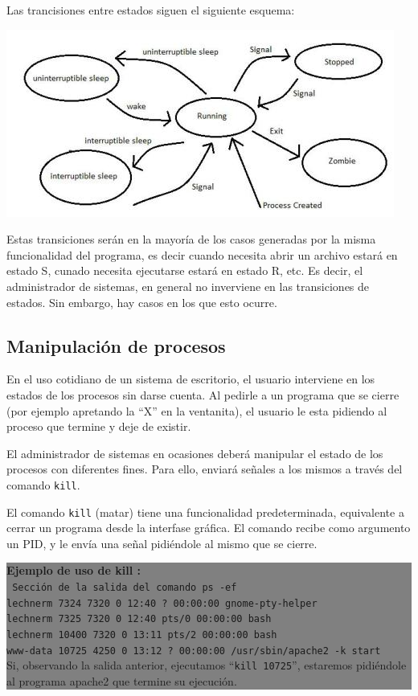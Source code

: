 \documentclass[12pt]{article}
\begin{document}
Las trancisiones entre estados siguen el siguiente esquema: 
\begin{center}
 \includegraphics{process-states-s.jpg}
\end{center}
 
Estas transiciones serán en la mayoría de los casos generadas por la misma
funcionalidad del programa, es decir cuando necesita abrir un archivo
estará en estado S, cunado necesita ejecutarse estará en estado R, etc. 
Es decir, el administrador de sistemas, en general no inverviene en las
transiciones de estados. Sin embargo, hay casos en los que esto ocurre. 

\subsection{Manipulación de procesos}

En el uso cotidiano de un sistema de escritorio, el usuario interviene 
en los estados de los procesos sin darse cuenta. Al pedirle a un programa
que se cierre (por ejemplo apretando la ``X'' en la ventanita), el usuario
le esta pidiendo al proceso que termine y deje de existir. 

El administrador de sistemas en ocasiones deberá manipular el estado de 
los procesos con diferentes fines. Para ello, enviará señales a los 
mismos a través del comando \texttt{kill}. 

El comando \texttt{kill} (matar) tiene una funcionalidad predeterminada, 
equivalente a cerrar un programa desde la interfase gráfica. El comando 
recibe como argumento un PID, y le envía una señal pidiéndole al mismo 
que se cierre. 

\colorbox{grey}{\parbox[t]{0.95\linewidth}{ \vspace*{0.5cm} { 
{\bf Ejemplo de uso de kill :} \\
{\tt
Sección de la salida del comando \texttt{ps -ef}\\
lechnerm  7324  7320  0 12:40 ?        00:00:00 gnome-pty-helper \\
lechnerm  7325  7320  0 12:40 pts/0    00:00:00 bash\\
lechnerm 10400  7320  0 13:11 pts/2    00:00:00 bash\\
www-data 10725  4250  0 13:12 ?        00:00:00 /usr/sbin/apache2 -k start \\
}
Si, observando la salida anterior, ejecutamos ``\texttt{kill 10725}'', 
estaremos pidiéndole al programa apache2 que termine su ejecución. 
} \vspace*{0.5cm} } } 
	
\end{document}
